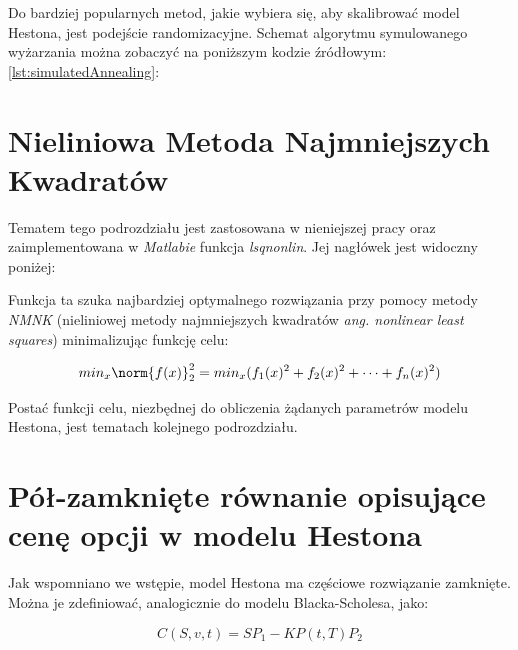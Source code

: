 \documentclass{pracamgr}
\begin{document}
Do bardziej popularnych metod, jakie wybiera się, aby skalibrować model Hestona, jest podejście randomizacyjne. Schemat algorytmu symulowanego wyżarzania można zobaczyć na poniższym kodzie źródłowym:
\ref{lst:simulatedAnnealing}:



\section{Nieliniowa Metoda Najmniejszych Kwadratów}

Tematem tego podrozdziału jest zastosowana w nieniejszej pracy oraz zaimplementowana w \textit{Matlabie} funkcja \textit{lsqnonlin}. Jej nagłówek jest widoczny poniżej:


Funkcja ta szuka najbardziej optymalnego rozwiązania przy pomocy metody \textit{NMNK} (nieliniowej metody najmniejszych kwadratów \textit{ang. nonlinear least squares}) minimalizując funkcję celu:

\begin{equation}
  min_x \norm{f(x)}^2_2 = min_x(f_1(x)^2 + f_2(x)^2 + \cdots + f_n(x)^2)
\end{equation}

Postać funkcji celu, niezbędnej do obliczenia żądanych parametrów modelu Hestona, jest tematach kolejnego podrozdziału.

\section{Pół-zamknięte równanie opisujące cenę opcji w modelu Hestona}

Jak wspomniano we wstępie, model Hestona ma częściowe rozwiązanie zamknięte. Można je zdefiniować, analogicznie do modelu Blacka-Scholesa, jako:

\begin{equation}
  C(S, v, t) = SP_1 -K P(t,T) P_2
\end{equation}
\end{document}
